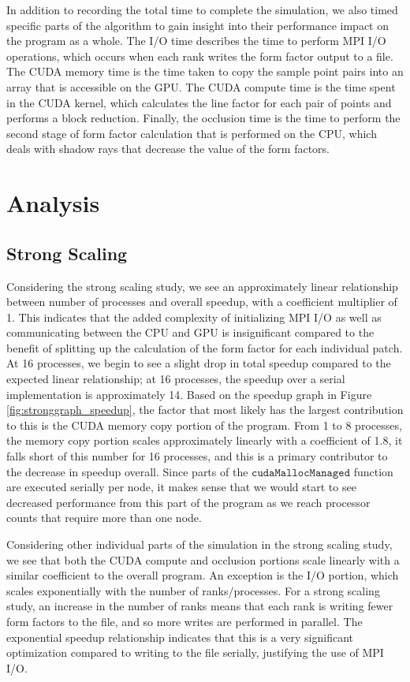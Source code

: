 \documentclass[conference]{IEEEtran}
\begin{document}
In addition to recording the total time to complete the simulation, we also timed specific parts of the algorithm to gain insight into their performance impact on the program as a whole. The I/O time describes the time to perform MPI I/O operations, which occurs when each rank writes the form factor output to a file. The CUDA memory time is the time taken to copy the sample point pairs into an array that is accessible on the GPU. The CUDA compute time is the time spent in the CUDA kernel, which calculates the line factor for each pair of points and performs a block reduction. Finally, the occlusion time is the time to perform the second stage of form factor calculation that is performed on the CPU, which deals with shadow rays that decrease the value of the form factors.  

\section{Analysis}
\subsection{Strong Scaling}
Considering the strong scaling study, we see an approximately linear relationship between number of processes and overall speedup, with a coefficient multiplier of 1. This indicates that the added complexity of initializing MPI I/O as well as communicating between the CPU and GPU is insignificant compared to the benefit of splitting up the calculation of the form factor for each individual patch.  At 16 processes, we begin to see a slight drop in total speedup compared to the expected linear relationship; at 16 processes, the speedup over a serial implementation is approximately 14. Based on the speedup graph in Figure \ref{fig:stronggraph_speedup}, the factor that most likely has the largest contribution to this is the CUDA memory copy portion of the program. From 1 to 8 processes, the memory copy portion scales approximately linearly with a coefficient of 1.8, it falls short of this number for 16 processes, and this is a primary contributor to the decrease in speedup overall. Since parts of the $\texttt{cudaMallocManaged}$ function are executed serially per node, it makes sense that we would start to see decreased performance from this part of the program as we reach processor counts that require more than one node. 

Considering other individual parts of the simulation in the strong scaling study, we see that both the CUDA compute and occlusion portions scale linearly with a similar coefficient to the overall program. An exception is the I/O portion, which scales exponentially with the number of ranks/processes. For a strong scaling study, an increase in the number of ranks means that each rank is writing fewer form factors to the file, and so more writes are performed in parallel. The exponential speedup relationship indicates that this is a very significant optimization compared to writing to the file serially, justifying the use of MPI I/O.
\end{document}
